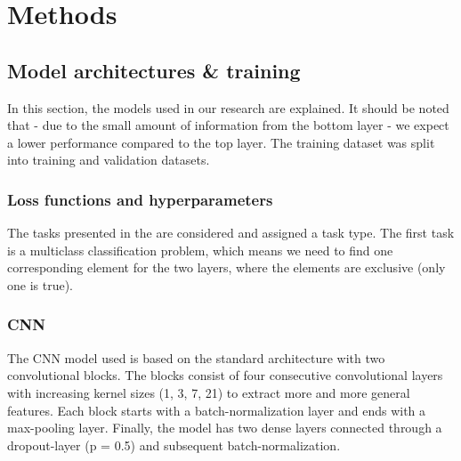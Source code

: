 
\chapter{Methods} %

\label{Chapter3} %







\section{Model architectures \& training}
In this section, the models used in our research are explained.
It should be noted that - due to the small amount of information from the bottom layer - we expect a lower performance compared to the top layer.
The training dataset was split into training and validation datasets.

\subsection{Loss functions and hyperparameters}
The tasks presented in the  are considered and assigned a task type.
The first task is a multiclass classification problem, which means we need to find one corresponding element for the two layers, where the elements are exclusive (only one is true).

\subsection{CNN}
The CNN model used is based on the standard architecture with two convolutional blocks. The blocks consist of four consecutive convolutional layers with increasing kernel sizes (1, 3, 7, 21) to extract more and more general features. Each block starts with a batch-normalization layer and ends with a max-pooling layer. Finally, the model has two dense layers connected through a dropout-layer (p = 0.5) and subsequent batch-normalization.

